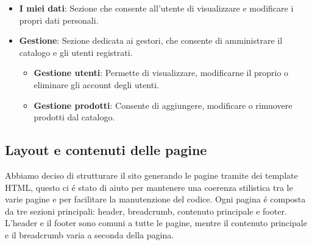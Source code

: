 \begin{itemize}
\begin{itemize}
        \item \textbf{I miei dati}: Sezione che consente all’utente di visualizzare e modificare i propri dati personali.
        \item \textbf{Gestione}: Sezione dedicata ai gestori, che consente di amministrare il catalogo e gli utenti registrati.
        \begin{itemize}
            \item \textbf{Gestione utenti}: Permette di visualizzare, modificarne il proprio o eliminare gli account degli utenti.
            \item \textbf{Gestione prodotti}: Consente di aggiungere, modificare o rimuovere prodotti dal catalogo.
        \end{itemize}
    \end{itemize}
\end{itemize}


\begin{figure}[h]
\centering
{}
\end{figure}

\subsection{Layout e contenuti delle pagine}

Abbiamo deciso di strutturare il sito generando le pagine tramite dei template HTML, questo ci é stato di aiuto per mantenere una coerenza stilistica tra le varie pagine e per facilitare la manutenzione del codice. Ogni pagina é composta da tre sezioni principali: header, breadcrumb, contenuto principale e footer. L'header e il footer sono comuni a tutte le pagine, mentre il contenuto principale e il breadcrumb varia a seconda della pagina.

